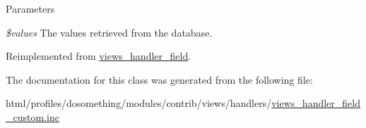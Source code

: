 \begin{DoxyParams}{Parameters}
\item[{\em \$values}]The values retrieved from the database. \end{DoxyParams}


Reimplemented from \hyperlink{classviews__handler__field_a82ff951c5e9ceb97b2eab86f880cbc1e}{views\_\-handler\_\-field}.

The documentation for this class was generated from the following file:\begin{DoxyCompactItemize}
\item 
html/profiles/dosomething/modules/contrib/views/handlers/\hyperlink{views__handler__field__custom_8inc}{views\_\-handler\_\-field\_\-custom.inc}\end{DoxyCompactItemize}
